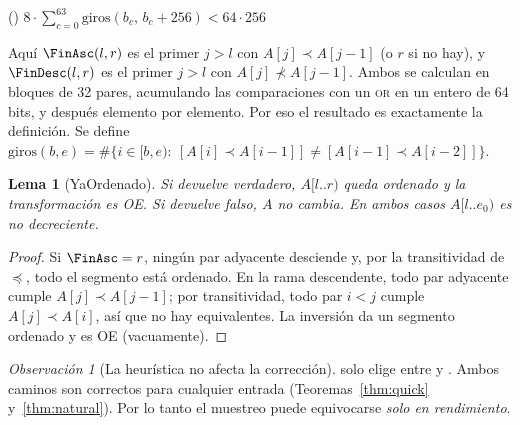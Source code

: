 \documentclass[10pt,a4paper]{article}
\theoremstyle{plain}
\newtheorem{lema}[teorema]{Lema}
\theoremstyle{definition}
\theoremstyle{remark}
\newtheorem{observacion}[teorema]{Observación}
\newcommand{\lt}{\prec}
\newcommand{\nlt}{\not\prec}
\newcommand{\les}{\preccurlyeq}
\begin{document}
\begin{algorithm}[H]
\caption{Detección y punto de entrada}\label{alg:main}
\Fn{\Ordenado{$l, r$}}{
  $i\gets$ \FinAsc{$l, r$}\tcp*{bloques de 32 sin branch; ver texto}
  \lIf{$i = r$}{\KwRet $\mathbf{true}$}
  $e_0\gets i$\tcp*{fin del prefijo no decreciente, se reutiliza}
  \If{$i = l+1$ \KwAnd \FinDesc{$l, r$} $= r$}{invertir $A[l..r)$; \KwRet $\mathbf{true}$}
  \KwRet $\mathbf{false}$\;
}
\BlankLine
\Fn(){}{
  \KwRet $8\cdot\sum_{c=0}^{63}\mathrm{giros}(b_c,\,b_c{+}256) < 64\cdot256$
}
\BlankLine
{}
\end{algorithm}

Aquí $\FinAsc(l,r)$ es el primer $j>l$ con $A[j]\lt A[j-1]$ (o $r$ si no hay), y
$\FinDesc(l,r)$ es el primer $j>l$ con $A[j]\nlt A[j-1]$. Ambos se calculan en
bloques de 32 pares, acumulando las comparaciones con un \textsc{or} en un entero de
64 bits, y después elemento por elemento. Por eso el resultado es exactamente la
definición. Se define $\mathrm{giros}(b,e)=\#\{i\in[b,e):\ [A[i]\lt A[i-1]]\ne
[A[i-1]\lt A[i-2]]\}$.

\begin{lema}[YaOrdenado]\label{lem:yaord}
Si \Ordenado devuelve verdadero, $A[l..r)$ queda ordenado y la transformación es OE.
Si devuelve falso, $A$ no cambia. En ambos casos $A[l..e_0)$ es no decreciente.
\end{lema}
\begin{proof}
Si $\FinAsc=r$, ningún par adyacente desciende y, por la transitividad de $\les$, todo
el segmento está ordenado. En la rama descendente, todo par adyacente cumple
$A[j]\lt A[j-1]$; por transitividad, todo par $i<j$ cumple $A[j]\lt A[i]$, así que no
hay equivalentes. La inversión da un segmento ordenado y es OE (vacuamente).
\end{proof}

\begin{observacion}[La heurística no afecta la corrección]\label{obs:heur}
\PocosGiros solo elige entre \Natural y \Quick. Ambos caminos son correctos para
cualquier entrada (Teoremas~\ref{thm:quick} y~\ref{thm:natural}). Por lo tanto el
muestreo puede equivocarse \emph{solo en rendimiento}.
\end{observacion}
\end{document}
